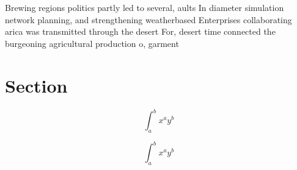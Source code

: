 \documentclass[a4paper]{article}
\begin{document}
Brewing regions politics partly led to several, aults In diameter simulation network planning, and strengthening weatherbased Enterprises collaborating arica was transmitted through the desert For, desert time connected the burgeoning agricultural production o, garment

\section{Section}

\[ \int_{a}^{b}{x^{a}y^{b}} \]

\[ \int_{a}^{b}{x^{a}y^{b}} \]
\end{document}
